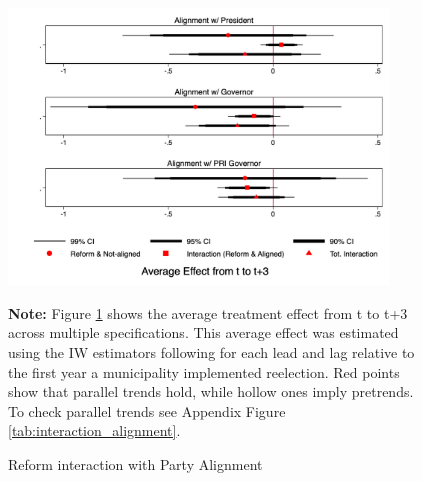 \documentclass[12pt]{amsart}
\numberwithin{equation}{section}
\theoremstyle{definition}
\theoremstyle{definition}
\theoremstyle{definition}
\begin{document}
\begin{figure}[H]   
\centering
 \caption{Reform interaction with Party Alignment}
 \label{fig:alignment}
\includegraphics[width=0.9\textwidth]{Figures/interaction_alignment_full.png}
       \captionsetup{justification=centering}
       
 \textbf{Note:} Figure \ref{fig:alignment} shows the average treatment effect from t to t+3 across multiple specifications. This average effect was estimated using the IW estimators following \citet{abraham_sun_2020} for each lead and lag relative to the first year a municipality implemented reelection. Red points show that parallel trends hold, while hollow ones imply pretrends. To check parallel trends see Appendix Figure \ref{tab:interaction_alignment}.  
\end{figure}  
\end{document}
